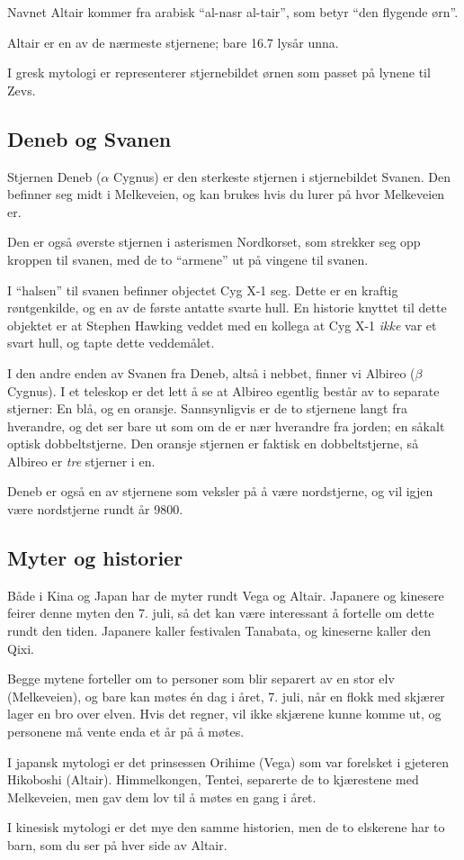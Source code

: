 \documentclass[../SommerstjernerA4.tex]{subfiles}
\begin{document}
Navnet Altair kommer fra arabisk ``al-nasr al-tair'', som betyr ``den flygende ørn''.

Altair er en av de nærmeste stjernene; bare 16.7 lysår unna.

I gresk mytologi er representerer stjernebildet ørnen som passet på lynene til Zevs.

\subsection{Deneb og Svanen}
Stjernen Deneb ($\alpha$ Cygnus) er den sterkeste stjernen i stjernebildet Svanen. Den befinner seg midt i Melkeveien, og kan brukes hvis du lurer på hvor Melkeveien er.

Den er også øverste stjernen i asterismen Nordkorset, som strekker seg opp kroppen til svanen, med de to ``armene'' ut på vingene til svanen.

I ``halsen'' til svanen befinner objectet Cyg X-1 seg. Dette er en kraftig røntgenkilde, og en av de første antatte svarte hull. En historie knyttet til dette objektet er at Stephen Hawking veddet med en kollega at Cyg X-1 \emph{ikke} var et svart hull, og tapte dette veddemålet.

I den andre enden av Svanen fra Deneb, altså i nebbet, finner vi Albireo ($\beta$ Cygnus). I et teleskop er det lett å se at Albireo egentlig består av to separate stjerner: En blå, og en oransje. Sannsynligvis er de to stjernene langt fra hverandre, og det ser bare ut som om de er nær hverandre fra jorden; en såkalt optisk dobbeltstjerne. Den oransje stjernen er faktisk en dobbeltstjerne, så Albireo er \emph{tre} stjerner i en.

Deneb er også en av stjernene som veksler på å være nordstjerne, og vil igjen være nordstjerne rundt år 9800.

\subsection{Myter og historier}
Både i Kina og Japan har de myter rundt Vega og Altair. Japanere og kinesere feirer denne myten den 7. juli, så det kan være interessant å fortelle om dette rundt den tiden. Japanere kaller festivalen Tanabata, og kineserne kaller den Qixi.

Begge mytene forteller om to personer som blir separert av en stor elv (Melkeveien), og bare kan møtes én dag i året, 7. juli, når en flokk med skjærer lager en bro over elven. Hvis det regner, vil ikke skjærene kunne komme ut, og personene må vente enda et år på å møtes.

I japansk mytologi er det prinsessen Orihime (Vega) som var forelsket i gjeteren Hikoboshi (Altair). Himmelkongen, Tentei, separerte de to kjærestene med Melkeveien, men gav dem lov til å møtes en gang i året.

I kinesisk mytologi er det mye den samme historien, men de to elskerene har to barn, som du ser på hver side av Altair.
\end{document}
